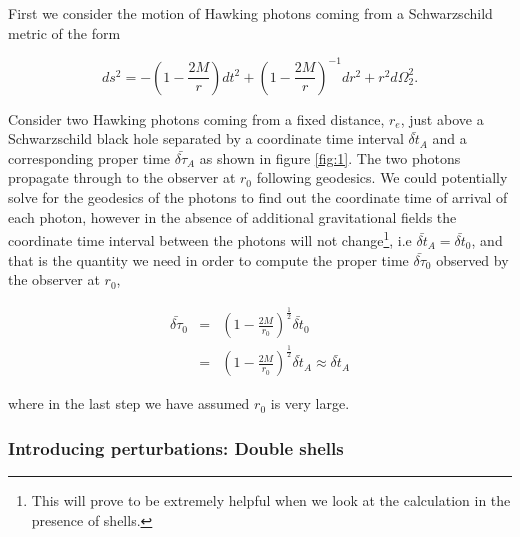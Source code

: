 \documentclass[aps,showpacs,twocolumn,floats,prd,superscriptaddress,nofootinbib]{revtex4-1}
\begin{document}
First we consider the motion of Hawking photons coming from a Schwarzschild metric of the form

\begin{equation}
	ds^2 = - \left( 1 - \frac{2M}{r} \right) dt^2 + \left( 1 - \frac{2M}{r} \right)^{-1} dr^2 + r^2 d \Omega_2^2.
\end{equation}

Consider two Hawking photons coming from a fixed distance, $r_{e}$, just above a Schwarzschild black hole separated by a coordinate time interval $\bar{\delta t}_A$ and a corresponding proper time $\bar{\delta \tau}_A$ as shown in figure \ref{fig:1}. The two photons propagate through to the observer at $r_0$ following geodesics. We could potentially solve for the geodesics of the photons to find out the coordinate time of arrival of each photon, however in the absence of additional gravitational fields the coordinate time interval between the photons will not change\footnote{This will prove to be extremely helpful when we look at the calculation in the presence of shells.}, i.e $\bar{\delta t}_A = \bar{\delta t}_0$, and that is the quantity we need in order to compute the proper time $\bar{\delta \tau}_0$ observed by the observer at $r_0$,

\begin{eqnarray}
	\bar{\delta \tau}_0 & = & \left( 1- \frac{2M}{r_0} \right)^\frac{1}{2} \bar{\delta t}_0	\nonumber	\\
	& = & \left( 1 - \frac{2M}{r_0} \right)^\frac{1}{2} \bar{\delta t}_A \approx \bar{\delta t}_{A} 
\end{eqnarray}

where in the last step we have assumed $r_0$ is very large.

\subsubsection{Introducing perturbations: Double shells}
\end{document}
